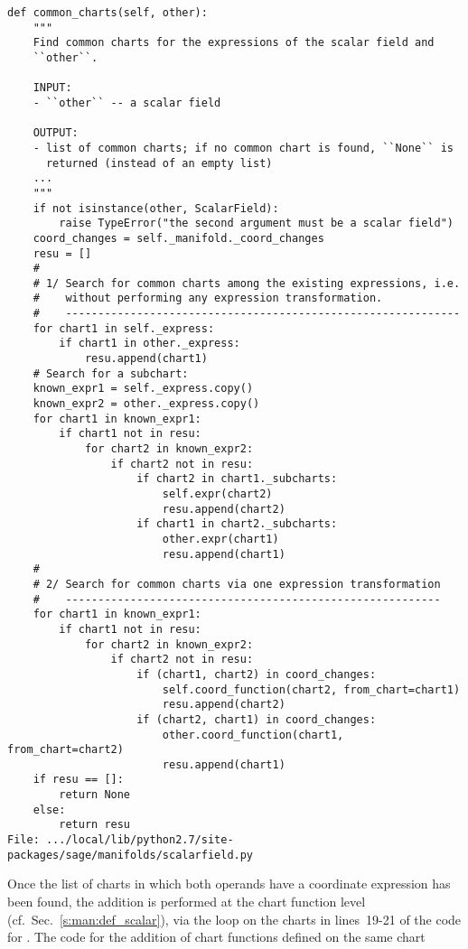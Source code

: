 \begin{lstlisting}
def common_charts(self, other):
    """
    Find common charts for the expressions of the scalar field and
    ``other``.

    INPUT:
    - ``other`` -- a scalar field

    OUTPUT:
    - list of common charts; if no common chart is found, ``None`` is
      returned (instead of an empty list)
    ...
    """
    if not isinstance(other, ScalarField):
        raise TypeError("the second argument must be a scalar field")
    coord_changes = self._manifold._coord_changes
    resu = []
    #
    # 1/ Search for common charts among the existing expressions, i.e.
    #    without performing any expression transformation.
    #    -------------------------------------------------------------
    for chart1 in self._express:
        if chart1 in other._express:
            resu.append(chart1)
    # Search for a subchart:
    known_expr1 = self._express.copy()
    known_expr2 = other._express.copy()
    for chart1 in known_expr1:
        if chart1 not in resu:
            for chart2 in known_expr2:
                if chart2 not in resu:
                    if chart2 in chart1._subcharts:
                        self.expr(chart2)
                        resu.append(chart2)
                    if chart1 in chart2._subcharts:
                        other.expr(chart1)
                        resu.append(chart1)
    #
    # 2/ Search for common charts via one expression transformation
    #    ----------------------------------------------------------
    for chart1 in known_expr1:
        if chart1 not in resu:
            for chart2 in known_expr2:
                if chart2 not in resu:
                    if (chart1, chart2) in coord_changes:
                        self.coord_function(chart2, from_chart=chart1)
                        resu.append(chart2)
                    if (chart2, chart1) in coord_changes:
                        other.coord_function(chart1, from_chart=chart2)
                        resu.append(chart1)
    if resu == []:
        return None
    else:
        return resu
File: .../local/lib/python2.7/site-packages/sage/manifolds/scalarfield.py
\end{lstlisting}
Once the list of charts in which both operands have a coordinate expression
has been found,
the addition is performed at the chart function level (cf.\ Sec.~\ref{s:man:def_scalar}),
via the loop on the charts in lines~19-21 of the code for .
The code for the addition of chart functions defined on the same chart
